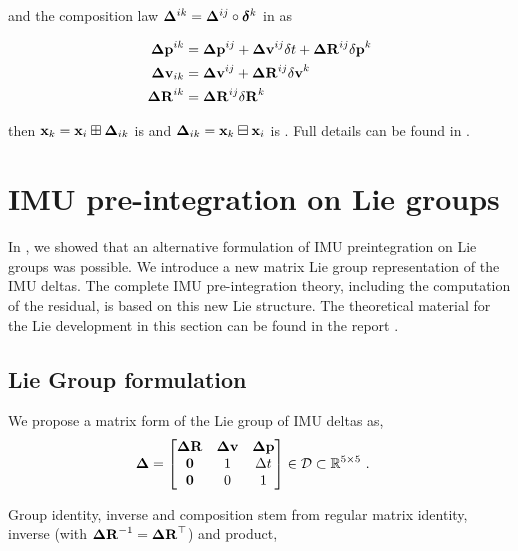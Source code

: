 and the composition law ${\bm \Delta}^{ik}={\bm \Delta}^{ij}\circ\bm\delta^k$ in  as

\begin{align} \label{eq:composition_delta}
    \begin{split}
    {\bm \Delta {\bf p}}^{ik} 
    &= {\bm \Delta {\bf p}}^{ij} + {\bm \Delta {\bf v}}^{ij}\delta t + {\bm \Delta {\bf R}}^{ij}{\delta{\bf p}}^{k} \\
    {\bm \Delta {\bf v}}_{ik} 
    &= {\bm \Delta {\bf v}}^{ij} + {\bm \Delta {\bf R}}^{ij}{\delta{\bf v}}^{k} \\
    {\bm \Delta {\bf R}}^{ik} 
    &= {\bm \Delta {\bf R}}^{ij}{\delta{\bf R}}^{k} 
    \end{split}
\end{align}

then ${\bf x}_k={\bf x}_i\boxplus{\bm \Delta}_{ik}$ is \cite[eq.~32]{forster2017-TRO} and ${\bm \Delta}_{ik}={\bf x}_k\boxminus{\bf x}_i$ is \cite[eq.~33]{forster2017-TRO}. 
Full details can be found in \cite[Section 3.4]{atchuthan-18-thesis}.





%
%
%
%
\section{IMU pre-integration on Lie groups}
In \cite{fourmy2019absolute}, we showed that an alternative formulation of IMU preintegration on Lie groups was possible.
We introduce a new matrix Lie group representation of
the IMU deltas. The complete IMU pre-integration theory,
including the computation of the residual, is based on this
new Lie structure. The theoretical material for the Lie
development in this section can be found in the report \cite{sola2018micro}.

\subsection{Lie Group formulation}

We propose a matrix form of the Lie group of IMU deltas as,
%
\begin{align}\label{equ:delta_Lie}
{{\bm \Delta}} &= 
\begin{bmatrix}
{\bm \Delta {\bf R}} & {\bm \Delta {\bf v}} & {\bm \Delta {\bf p}} \\
\bf0 & 1 & \Delta t \\
\bf0 & 0 & 1
\end{bmatrix} \in \mathcal{D} \subset {\mathbb R}^{5\times 5}
~.
\end{align}

Group identity, inverse and composition stem from regular matrix identity, inverse (with ${\bm \Delta {\bf R}}^{-1}={\bm \Delta {\bf R}}^{\top}$) and product,

